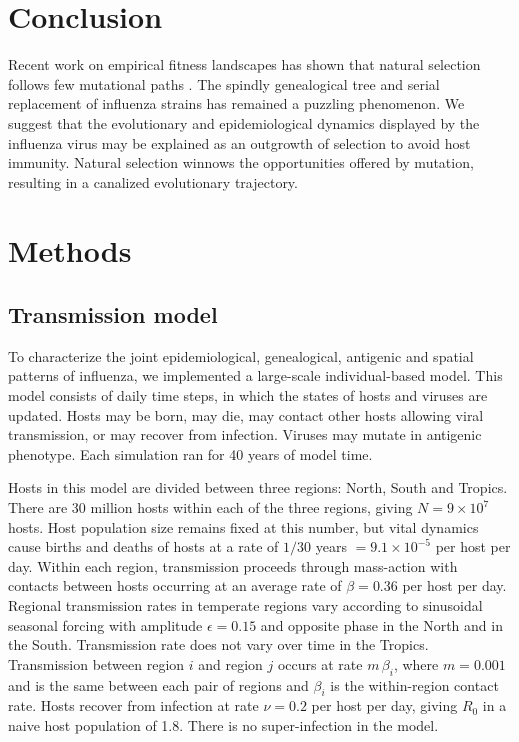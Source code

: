 \documentclass[11pt,oneside,letterpaper]{article}
\begin{document}
\section*{Conclusion}

Recent work on empirical fitness landscapes has shown that natural selection follows few mutational paths \cite{Weinreich06}.  The spindly genealogical tree and serial replacement of influenza strains has remained a puzzling phenomenon.  We suggest that the evolutionary and epidemiological dynamics displayed by the influenza virus may be explained as an outgrowth of selection to avoid host immunity.  Natural selection winnows the opportunities offered by mutation, resulting in a canalized evolutionary trajectory.

\section*{Methods}

\subsection*{Transmission model}

To characterize the joint epidemiological, genealogical, antigenic and spatial patterns of influenza, we implemented a large-scale individual-based model.  This model consists of daily time steps, in which the states of hosts and viruses are updated.  Hosts may be born, may die, may contact other hosts allowing viral transmission, or may recover from infection.  Viruses may mutate in antigenic phenotype.  Each simulation ran for 40 years of model time.  

Hosts in this model are divided between three regions: North, South and Tropics.  There are 30 million hosts within each of the three regions, giving $N = 9 \times 10^{7}$ hosts.  Host population size remains fixed at this number, but vital dynamics cause births and deaths of hosts at a rate of $1 / 30$ years $= 9.1 \times 10^{-5}$ per host per day.  Within each region, transmission proceeds through mass-action with contacts between hosts occurring at an average rate of $\beta = 0.36$ per host per day.  Regional transmission rates in temperate regions vary according to sinusoidal seasonal forcing with amplitude $\epsilon = 0.15$ and opposite phase in the North and in the South.  Transmission rate does not vary over time in the Tropics.  Transmission between region $i$ and region $j$ occurs at rate $m\,\beta_i$, where $m=0.001$ and is the same between each pair of regions and $\beta_i$ is the within-region contact rate.   Hosts recover from infection at rate $\nu = 0.2$ per host per day, giving $R_0$ in a naive host population of 1.8.  There is no super-infection in the model.
\end{document}
